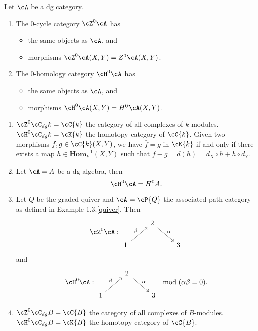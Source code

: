 \begin{defn}
Let $ \cA $ be a dg category. 
\begin{enumerate}
    \item The $ 0 $-cycle category $ \cZ^{0}\cA $ has 
    \begin{itemize}
        \item the same objects as $ \cA $, and
        \item morphisms $ \cZ^{0}\cA(X,Y) = Z^{0}\cA(X,Y) $.
    \end{itemize}
    \item The $ 0 $-homology category $ \cH^{0}\cA $ has 
    \begin{itemize}
        \item the same objects as $ \cA $, and
        \item morphisms $ \cH^{0}\cA(X,Y) = H^{0}\cA(X,Y) $.
    \end{itemize}
\end{enumerate}
\end{defn}

\begin{eg}
\begin{enumerate}
    \item $ \cZ^{0}\cC_{dg}k = \cC{k} $ the category of all complexes of $ k $-modules. \\ 
   $ \cH^{0}\cC_{dg}k = \cK{k} $ the homotopy category of $ \cC{k} $. Given two morphisms $ f,g\in\cC{k}(X,Y) $, we have $ \bar{f} = \bar{g} $ in $ \cK{k} $ if and only if there exists a map $ h\in \mathbf{Hom}^{-1}_{k}(X,Y) $ such that 
    $ f-g = d(h) = d_{X}\circ h + h\circ d_{Y}. $
    \item Let $ \cA = A $ be a dg algebra, then 
    \[ \cH^{0}\cA = H^{0}A. \]
    \item Let $ Q $ be the graded quiver and $ \cA = \cP{Q} $ the associated path category as defined in Example 1.3.\ref{quiver}. Then 
    \[\cZ^{0}\cA: \begin{tikzcd}
    & 2 \ar[dr,"\alpha"] & \\
    1 \ar[ur,"\beta"] &  & 3
    \end{tikzcd}\]
    and 
    \[ \cH^{0}\cA: \begin{tikzcd}
    & 2 \ar[dr,"\alpha"] & \\
    1 \ar[ur,"\beta"] &  & 3
    \end{tikzcd} \mod (\alpha\beta = 0). \]
    \item $ \cZ^{0}\cC_{dg}B = \cC{B} $ the category of all complexes of $ B $-modules. \\
    $ \cH^{0}\cC_{dg}B = \cK{B} $ the homotopy category of $ \cC{B} $.
\end{enumerate}
\end{eg}

